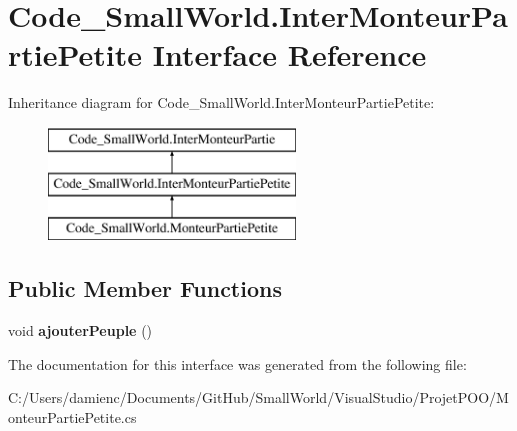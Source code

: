 \hypertarget{interface_code___small_world_1_1_inter_monteur_partie_petite}{\section{Code\-\_\-\-Small\-World.\-Inter\-Monteur\-Partie\-Petite Interface Reference}
\label{interface_code___small_world_1_1_inter_monteur_partie_petite}
}
Inheritance diagram for Code\-\_\-\-Small\-World.\-Inter\-Monteur\-Partie\-Petite\-:\begin{figure}[H]
\begin{center}
\leavevmode
\includegraphics[height=3.000000cm]{interface_code___small_world_1_1_inter_monteur_partie_petite}
\end{center}
\end{figure}
\subsection*{Public Member Functions}
\begin{DoxyCompactItemize}
\item 
\hypertarget{interface_code___small_world_1_1_inter_monteur_partie_petite_a136baa469738fc9c5b855e217236ce9a}{void {\bfseries ajouter\-Peuple} ()}\label{interface_code___small_world_1_1_inter_monteur_partie_petite_a136baa469738fc9c5b855e217236ce9a}

\end{DoxyCompactItemize}


The documentation for this interface was generated from the following file\-:\begin{DoxyCompactItemize}
\item 
C\-:/\-Users/damienc/\-Documents/\-Git\-Hub/\-Small\-World/\-Visual\-Studio/\-Projet\-P\-O\-O/Monteur\-Partie\-Petite.\-cs\end{DoxyCompactItemize}
